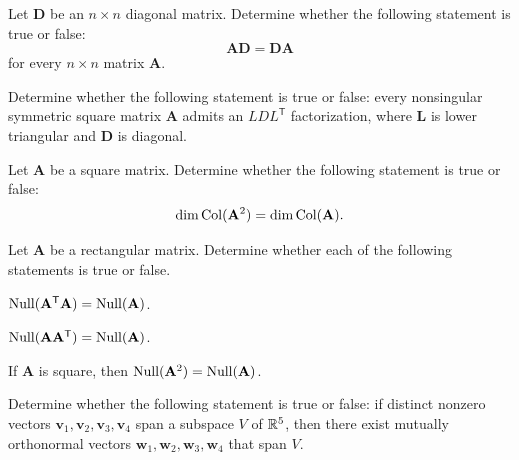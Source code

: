 \begin{problem}
Let $\mathbf D$ be an $n\times n$ diagonal matrix. Determine whether the following statement is true or false:
\[
\mathbf A\mathbf D=\mathbf D\mathbf A
\]
for every $n\times n$ matrix $\mathbf A$.
\end{problem}

\begin{problem}
Determine whether the following statement is true or false: every nonsingular symmetric square matrix $\mathbf A$ admits an $LDL^{\mathsf T}$ factorization, where $\mathbf L$ is lower triangular and $\mathbf D$ is diagonal.
\end{problem}

\begin{problem}
Let $\mathbf A$ be a square matrix. Determine whether the following statement is true or false:
\[
\dim\operatorname{Col}(\mathbf A^2)=\dim\operatorname{Col}(\mathbf A).
\]
\end{problem}

\begin{problem}
Let $\mathbf A$ be a rectangular matrix. Determine whether each of the following statements is true or false.
\begin{problemchoices}
\item $\operatorname{Null}(\mathbf A^{\mathsf T}\mathbf A)=\operatorname{Null}(\mathbf A)$.
\item $\operatorname{Null}(\mathbf A\mathbf A^{\mathsf T})=\operatorname{Null}(\mathbf A)$.
\item If $\mathbf A$ is square, then $\operatorname{Null}(\mathbf A^2)=\operatorname{Null}(\mathbf A)$.
\end{problemchoices}
\end{problem}

\begin{problem}
Determine whether the following statement is true or false: if distinct nonzero vectors $\mathbf v_1,\mathbf v_2,\mathbf v_3,\mathbf v_4$ span a subspace $V$ of $\mathbb{R}^5$, then there exist mutually orthonormal vectors $\mathbf w_1,\mathbf w_2,\mathbf w_3,\mathbf w_4$ that span $V$.
\end{problem}

